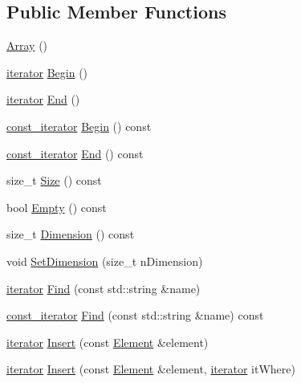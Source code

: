 \subsection*{Public Member Functions}
\begin{CompactItemize}
\item 
\hyperlink{class_p_d_i_1_1_array_33df64c314416b547065804689da7f74}{Array} ()
\item 
\hyperlink{class_p_d_i_1_1_array_ea216852e304c9b15049c0e595378d1d}{iterator} \hyperlink{class_p_d_i_1_1_array_f110c3266836cccdf9b6d52131386d07}{Begin} ()
\item 
\hyperlink{class_p_d_i_1_1_array_ea216852e304c9b15049c0e595378d1d}{iterator} \hyperlink{class_p_d_i_1_1_array_a1300755f06a94db2df66b3fb45c93a4}{End} ()
\item 
\hyperlink{class_p_d_i_1_1_array_3e4335ca32c34f7fd22e00e3aedc3e7f}{const\_\-iterator} \hyperlink{class_p_d_i_1_1_array_12672e30c0112d1b8c0ae240f5c6faa3}{Begin} () const 
\item 
\hyperlink{class_p_d_i_1_1_array_3e4335ca32c34f7fd22e00e3aedc3e7f}{const\_\-iterator} \hyperlink{class_p_d_i_1_1_array_b7f91c93e42edd7d87407092f2b4e4e4}{End} () const 
\item 
size\_\-t \hyperlink{class_p_d_i_1_1_array_27eaf51b3986777c67ed6832ebfc47f6}{Size} () const 
\item 
bool \hyperlink{class_p_d_i_1_1_array_714f51d4a977b0c1d361c212cd1b2618}{Empty} () const 
\item 
size\_\-t \hyperlink{class_p_d_i_1_1_array_d17e03ace992a6d0e57bab451fd0dda6}{Dimension} () const 
\item 
void \hyperlink{class_p_d_i_1_1_array_19bc4e564ec03997f2ae3efad54b0c27}{SetDimension} (size\_\-t nDimension)
\item 
\hyperlink{class_p_d_i_1_1_array_ea216852e304c9b15049c0e595378d1d}{iterator} \hyperlink{class_p_d_i_1_1_array_fac74ad3ceaa61f117762932643f4fce}{Find} (const std::string \&name)
\item 
\hyperlink{class_p_d_i_1_1_array_3e4335ca32c34f7fd22e00e3aedc3e7f}{const\_\-iterator} \hyperlink{class_p_d_i_1_1_array_a21e99c0f49f2dc36b9d1fd42c31a87b}{Find} (const std::string \&name) const 
\item 
\hyperlink{class_p_d_i_1_1_array_ea216852e304c9b15049c0e595378d1d}{iterator} \hyperlink{class_p_d_i_1_1_array_2b6d1df5bfbd6fcc9d9e07e7b9ec9b7a}{Insert} (const \hyperlink{class_p_d_i_1_1_element}{Element} \&element)
\item 
\hyperlink{class_p_d_i_1_1_array_ea216852e304c9b15049c0e595378d1d}{iterator} \hyperlink{class_p_d_i_1_1_array_1a57377b77b961453690f23d804a2b60}{Insert} (const \hyperlink{class_p_d_i_1_1_element}{Element} \&element, \hyperlink{class_p_d_i_1_1_array_ea216852e304c9b15049c0e595378d1d}{iterator} itWhere)

\end{CompactItemize}
